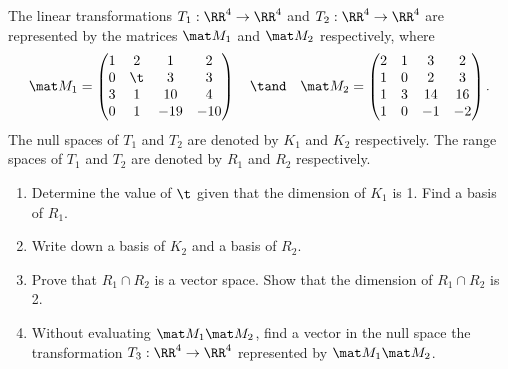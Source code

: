 \begin{problem}
    The linear transformations $T_1 : \RR^4 \to \RR^4$ and $T_2 : \RR^4 \to \RR^4$ are represented by the matrices $\mat M_1$ and $\mat M_2$ respectively, where \[\mat M_1 = \begin{pmatrix}1 & 2 & 1 & 2 \\ 0 & \t & 3 & 3 \\ 3 & 1 & 10 & 4 \\ 0 & 1 & -19 & -10 \end{pmatrix} \quad \tand \quad \mat M_2 = \begin{pmatrix}2 & 1 & 3 & 2 \\ 1 & 0 & 2 & 3 \\ 1 & 3 & 14 & 16 \\ 1 & 0 & -1 & -2\end{pmatrix}.\] The null spaces of $T_1$ and $T_2$ are denoted by $K_1$ and $K_2$ respectively. The range spaces of $T_1$ and $T_2$ are denoted by $R_1$ and $R_2$ respectively.

    \begin{enumerate}
        \item Determine the value of $\t$ given that the dimension of $K_1$ is 1. Find a basis of $R_1$.
        \item Write down a basis of $K_2$ and a basis of $R_2$.
        \item Prove that $R_1 \cap R_2$ is a vector space. Show that the dimension of $R_1 \cap R_2$ is 2.
        \item Without evaluating $\mat M_1 \mat M_2$, find a vector in the null space the transformation $T_3 : \RR^4 \to \RR^4$ represented by $\mat M_1 \mat M_2$.
    \end{enumerate}
\end{problem}
